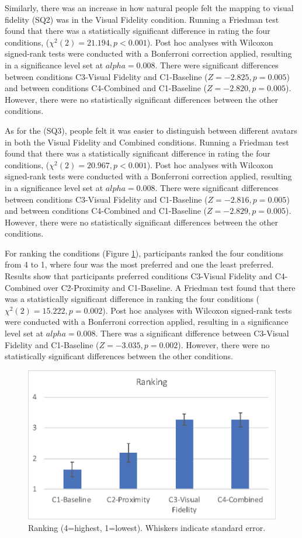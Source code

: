 Similarly, there was an increase in how natural people felt the mapping to visual fidelity (SQ2) was in the Visual Fidelity condition. Running a Friedman test found that there was a statistically significant difference in rating the four conditions, ($\chi^2(2)=21.194,p<0.001$). Post hoc analyses with Wilcoxon signed-rank tests were conducted with a Bonferroni correction applied, resulting in a significance level set at $alpha=0.008$. There were significant differences between conditions C3-Visual Fidelity and C1-Baseline ($Z=-2.825, p=0.005$) and between conditions C4-Combined and C1-Baseline ($Z=-2.820, p=0.005$). However, there were no statistically significant differences between the other conditions.

As for the (SQ3), people felt it was easier to distinguish between different avatars in both the Visual Fidelity and Combined conditions. Running a Friedman test found that there was a statistically significant difference in rating the four conditions, ($\chi^2(2)=20.967,p<0.001$). Post hoc analyses with Wilcoxon signed-rank tests were conducted with a Bonferroni correction applied, resulting in a significance level set at $alpha=0.008$. There were significant differences between conditions C3-Visual Fidelity and C1-Baseline ($Z=-2.816, p=0.005$) and between conditions C4-Combined and C1-Baseline ($Z=-2.829, p=0.005$). However, there were no statistically significant differences between the other conditions.

For ranking the conditions (Figure \ref{fig:contacts:ranking}), participants ranked the four conditions from 4 to 1, where four was the most preferred and one the least preferred. Results show that participants preferred conditions C3-Visual Fidelity and C4-Combined over C2-Proximity and C1-Baseline. A Friedman test found that there was a statistically significant difference in ranking the four conditions ($\chi^2(2)=15.222,p=0.002$). Post hoc analyses with Wilcoxon signed-rank tests were conducted with a Bonferroni correction applied, resulting in a significance level set at $alpha=0.008$. There was a significant difference between C3-Visual Fidelity and C1-Baseline ($Z=-3.035, p=0.002$). However, there were no statistically significant differences between the other conditions.

\begin{figure}[ht]
    \centering
    \includegraphics[width=0.8\linewidth]{images/41-visualising-mgia17/analysis-images-04.eps}
    \caption{Ranking (4=highest, 1=lowest). Whiskers indicate standard error.}
    \label{fig:contacts:ranking}
\end{figure}

